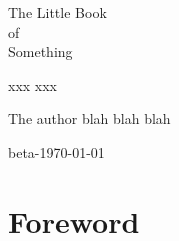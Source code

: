 \documentclass[oneside,11pt]{memoir}
\begin{document}
\thispagestyle{empty}

\begin{center}


{\huge The Little Book\\[0.75ex] of\\[1.75ex] Something}

\vspace*{4ex}

xxx xxx


\end{center}

\newpage



The author blah blah blah


\begin{flushright}
\footnotesize beta-\dotdate\today
\end{flushright}

\vspace*{-3ex}

\newpage


{
\everymath{\color{black}}
\tableofcontents* %
}

\clearpage

\listoffigures*
{}


\chapter*{Foreword}


\lipsum[1-3]
\end{document}
